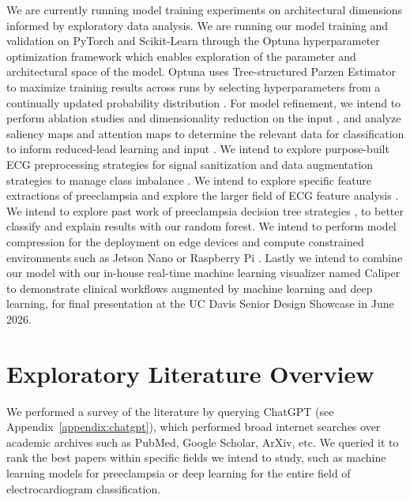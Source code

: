 \documentclass[sigconf,nonacm]{acmart}
\begin{document}
We are currently running model training experiments on architectural dimensions informed by exploratory data analysis. We are running our model training and validation on PyTorch and Scikit-Learn through the Optuna hyperparameter optimization framework which enables exploration of the parameter and architectural space of the model. Optuna uses Tree-structured Parzen Estimator to maximize training results across runs by selecting hyperparameters from a continually updated probability distribution \cite{akiba_optuna_2019}.
For model refinement, we intend to perform ablation studies and dimensionality reduction on the input \cite{xue_does_2024,attia_automated_2022}, and analyze saliency maps and attention maps to determine the relevant data for classification to inform reduced-lead learning and input \cite{selvaraju_grad-cam_2020}. We intend to explore purpose-built ECG preprocessing strategies for signal sanitization \cite{jia_preprocessing_2024,satija_review_2018} and data augmentation strategies to manage class imbalance \cite{rahman_systematic_2023,xia_generative_2023}. We intend to explore specific feature extractions of preeclampsia \cite{angeli_novel_2015,raffaelli_pre-eclampsia_2014} and explore the larger field of ECG feature analysis \cite{kaplan_berkaya_survey_2018,singh_ecg_2023}. We intend to explore past work of preeclampsia decision tree strategies \cite{park_pchd_2014,musa_predicting_2023}, to better classify and explain results with our random forest.
We intend to perform model compression for the deployment on edge devices and compute constrained environments such as Jetson Nano or Raspberry Pi \cite{keivanimehr_tinyml_2025,gupta_comprehensive_2024}.
Lastly we intend to combine our model with our in-house real-time machine learning visualizer named Caliper to demonstrate clinical workflows augmented by machine learning and deep learning, for final presentation at the UC Davis Senior Design Showcase in June 2026.


\section{Exploratory Literature Overview}

We performed a survey of the literature by querying ChatGPT (see Appendix~\ref{appendix:chatgpt}), which performed broad internet searches over academic archives such as PubMed, Google Scholar, ArXiv, etc. We queried it to rank the best papers within specific fields we intend to study, such as machine learning models for preeclampsia or deep learning for the entire field of electrocardiogram classification.
\end{document}
